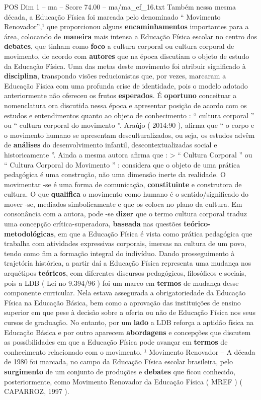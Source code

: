 \begin{textsample}{POS Dim 1 – ma – Score 74.00 – ma/ma\_ef\_16.txt}
Também nessa mesma década, a Educação Física foi marcada pelo denominado “ Movimento Renovador”,¹ que proporcionou alguns \textbf{encaminhamentos} importantes para a área, colocando de \textbf{maneira} mais intensa a Educação Física escolar no centro dos \textbf{debates}, que tinham como \textbf{foco} a cultura corporal ou cultura corporal de movimento, de acordo com \textbf{autores} que na época discutiam o objeto de estudo da Educação Física.
Uma das metas deste movimento foi atribuir significado à \textbf{disciplina}, transpondo visões reducionistas que, por vezes, marcaram a Educação Física com uma profunda crise de identidade, pois o modelo adotado anteriormente não ofereceu os frutos \textbf{esperados}.
É \textbf{oportuno} conceituar a nomenclatura ora discutida nessa época e apresentar posição de acordo com os estudos e entendimentos quanto ao objeto de conhecimento : “ cultura corporal ” ou “ cultura corporal do movimento ”.
Araújo ( 2014:90 ), afirma que “ o corpo e o movimento humano se apresentam desculturalizados, ou seja, os estudos advêm de \textbf{análises} do desenvolvimento infantil, descontextualizadas social e historicamente ”.
Ainda a mesma autora afirma que : > “ Cultura Corporal ” ou “ Cultura Corporal do Movimento ” : considera que o objeto de uma prática pedagógica é uma construção, não uma dimensão inerte da realidade.
O movimentar -se é uma forma de comunicação, \textbf{constituinte} e construtora de cultura.
O que \textbf{qualifica} o movimento como humano é o sentido/significado do mover -se, mediados simbolicamente e que os coloca no plano da cultura.
Em consonância com a autora, pode -se \textbf{dizer} que o termo cultura corporal traduz uma concepção crítica-superadora, \textbf{baseada} nas questões \textbf{teórico-metodológicas}, em que a Educação Física é vista como prática pedagógica que trabalha com atividades expressivas corporais, imersas na cultura de um povo, tendo como fim a formação integral do indivíduo.
Dando prosseguimento à trajetória histórica, a partir daí a Educação Física representa uma mudança nos arquétipos \textbf{teóricos}, com diferentes discursos pedagógicos, filosóficos e sociais, pois a LDB ( Lei no 9.394/96 ) foi um marco em \textbf{termos} de mudança desse componente curricular.
Nela estava assegurada a obrigatoriedade da Educação Física na Educação Básica, bem como a aprovação das instituições de ensino superior em que pese à decisão sobre a oferta ou não de Educação Física nos seus cursos de graduação.
No entanto, por um \textbf{lado} a LDB reforça a aptidão física na Educação Básica e por outro aparecem \textbf{abordagens} e concepções que discutem as possibilidades em que a Educação Física pode avançar em \textbf{termos} de conhecimento relacionado com o movimento. ¹ Movimento Renovador – A década de 1980 foi marcada, no campo da Educação Física escolar brasileira, pelo \textbf{surgimento} de um conjunto de produções e \textbf{debates} que ficou conhecido, posteriormente, como Movimento Renovador da Educação Física ( MREF ) ( CAPARROZ, 1997 ).

\end{textsample}
